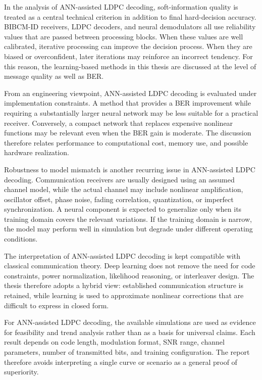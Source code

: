 In the analysis of ANN-assisted LDPC decoding, soft-information quality is treated as a central technical criterion in addition to final hard-decision accuracy. BIBCM-ID receivers, LDPC decoders, and neural demodulators all use reliability values that are passed between processing blocks. When these values are well calibrated, iterative processing can improve the decision process. When they are biased or overconfident, later iterations may reinforce an incorrect tendency. For this reason, the learning-based methods in this thesis are discussed at the level of message quality as well as BER.

From an engineering viewpoint, ANN-assisted LDPC decoding is evaluated under implementation constraints. A method that provides a BER improvement while requiring a substantially larger neural network may be less suitable for a practical receiver. Conversely, a compact network that replaces expensive nonlinear functions may be relevant even when the BER gain is moderate. The discussion therefore relates performance to computational cost, memory use, and possible hardware realization.

Robustness to model mismatch is another recurring issue in ANN-assisted LDPC decoding. Communication receivers are usually designed using an assumed channel model, while the actual channel may include nonlinear amplification, oscillator offset, phase noise, fading correlation, quantization, or imperfect synchronization. A neural component is expected to generalize only when its training domain covers the relevant variations. If the training domain is narrow, the model may perform well in simulation but degrade under different operating conditions.

The interpretation of ANN-assisted LDPC decoding is kept compatible with classical communication theory. Deep learning does not remove the need for code constraints, power normalization, likelihood reasoning, or interleaver design. The thesis therefore adopts a hybrid view: established communication structure is retained, while learning is used to approximate nonlinear corrections that are difficult to express in closed form.

For ANN-assisted LDPC decoding, the available simulations are used as evidence for feasibility and trend analysis rather than as a basis for universal claims. Each result depends on code length, modulation format, SNR range, channel parameters, number of transmitted bits, and training configuration. The report therefore avoids interpreting a single curve or scenario as a general proof of superiority.

